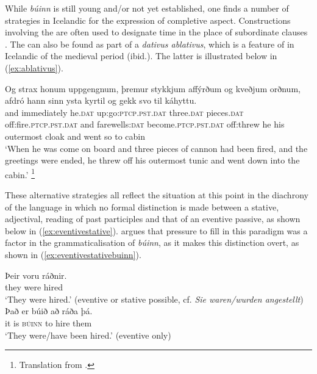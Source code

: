 \documentclass[output=paper,colorlinks,citecolor=brown]{langscibook}
\begin{document}
While \textit{búinn} is still young and/or not yet established, one finds a number of strategies in Icelandic for the expression of completive aspect. Constructions involving the   are often used to designate time in the place of subordinate clauses \citep[399]{hauksson1994islensk}. The   can also be found as part of a \textit{dativus ablativus}, which is a feature of  in Icelandic of the medieval period (ibid.). The latter is illustrated below in (\ref{ex:ablativus}).

\begin{exe}
\ex\label{ex:ablativus} 
\gll Og strax honum uppgengnum, þremur stykkjum affýrðum og kveðjum orðnum, afdró hann sinn ysta kyrtil og gekk svo til káhyttu. \\
and immediately he.\textsc{dat} up:go:\textsc{ptcp.pst.dat} three.\textsc{dat} pieces.\textsc{dat} off:fire.\textsc{ptcp.pst.dat} and farewells:\textsc{dat} become.\textsc{ptcp.pst.dat} off:threw he his outermost cloak and went so to cabin \\
\trans `When he was come on board and three pieces of cannon had been fired, and the greetings were ended, he threw off his outermost tunic and went down into the cabin.' \hfill \citep[111]{olafsson1908aefisaga}\footnote{Translation from \citet[203--204]{phillpotts2017life}.}
\end{exe}

These alternative strategies all reflect the situation at this point in the diachrony of the language in which no formal distinction is made between a stative, adjectival, reading of past participles and that of an eventive passive, as shown below in (\ref{ex:eventivestative}). \citet{kress1982islandische} argues that pressure to fill in this paradigm was a factor in the grammaticalisation of \textit{búinn}, as it makes this distinction overt, as shown in (\ref{ex:eventivestativebuinn}).

\ea
  \ea\label{ex:eventivestative}{
\gll Þeir voru ráðnir. \\
they were hired \\
\glt `They were hired.' (eventive or stative possible, cf. \textit{Sie waren/wurden angestellt}) \hfill \citep{kress1982islandische}
  }
  \ex\label{ex:eventivestativebuinn}{
    \gll Það er búið að ráða þá. \\
    it is \textsc{búinn} to hire them\\
    \glt `They were/have been hired.' (eventive only) \hfill \citep{kress1982islandische}
  }
  \z
\z
\end{document}
